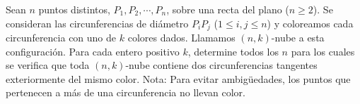 Sean $n$ puntos distintos, $P_1, P_2, \cdots , P_n$, sobre una recta del plano ($n \geq 2$). Se consideran las circunferencias de diámetro $P_i P_j$ ($1 \leq i,j \leq n$) y coloreamos cada circunferencia con uno de $k$ colores dados. Llamamos $(n,k)$-nube a esta configuración. \newline 
Para cada entero positivo $k$, determine todos los $n$ para los cuales se verifica que toda $(n,k)$-nube contiene dos circunferencias tangentes exteriormente del mismo color.
Nota: Para evitar ambigüedades, los puntos que pertenecen a más de una circunferencia no llevan color.
